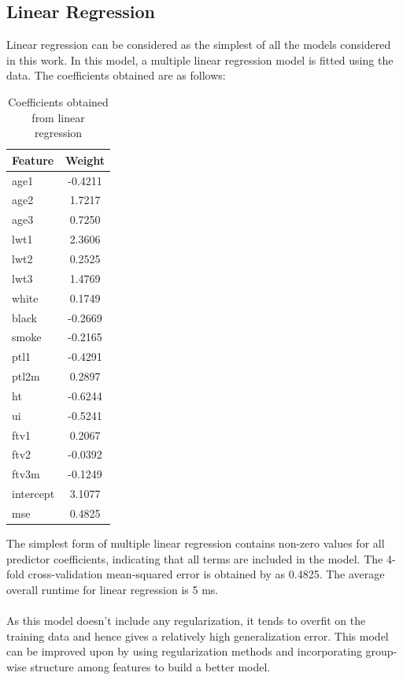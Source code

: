 \documentclass[a4paper,12pt]{article}
\begin{document}
		\subsection{Linear Regression}
		Linear regression can be considered as the simplest of all the models considered in this work. In this model, a multiple linear regression model is fitted using the data. The coefficients obtained are as follows:
		    \begin{table}[H]
		    \centering
            \begin{tabular}{|l|c|}
            \hline
            \textbf{Feature} & \textbf{Weight} \\ \hline
            age1             & -0.4211         \\ \hline
            age2             & 1.7217          \\ \hline
            age3             & 0.7250          \\ \hline
            lwt1             & 2.3606          \\ \hline
            lwt2             & 0.2525          \\ \hline
            lwt3             & 1.4769          \\ \hline
            white            & 0.1749          \\ \hline
            black            & -0.2669         \\ \hline
            smoke            & -0.2165         \\ \hline
            ptl1             & -0.4291         \\ \hline
            ptl2m            & 0.2897          \\ \hline
            ht               & -0.6244         \\ \hline
            ui               & -0.5241         \\ \hline
            ftv1             & 0.2067          \\ \hline
            ftv2             & -0.0392         \\ \hline
            ftv3m            & -0.1249         \\ \hline
            intercept        & 3.1077          \\ \hline
            mse              & 0.4825          \\ \hline
            \end{tabular}
            \caption{Coefficients obtained from linear regression}
            \end{table}
		\noindent The simplest form of multiple linear regression contains non-zero values for all predictor coefficients, indicating that all terms are included in the model. The 4-fold cross-validation mean-squared error is obtained by as 0.4825. The average overall runtime for linear regression is 5 ms.
		\\\\
		As this model doesn't include any regularization, it tends to overfit on the training data and hence gives a relatively high generalization error. This model can be improved upon by using regularization methods and incorporating group-wise structure among features to build a better model.
\end{document}
